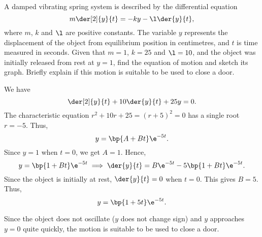 \begin{problem}
    A damped vibrating spring system is described by the differential equation \[m \der[2]{y}{t} = -ky - \l \der{y}{t},\] where $m$, $k$ and $\l$ are positive constants. The variable $y$ represents the displacement of the object from equilibrium position in centimetres, and $t$ is time measured in seconds. Given that $m = 1$, $k = 25$ and $\l = 10$, and the object was initially released from rest at $y = 1$, find the equation of motion and sketch its graph. Briefly explain if this motion is suitable to be used to close a door.
\end{problem}
\begin{solution}
    We have \[\der[2]{y}{t} + 10 \der{y}{t} + 25y = 0.\] The characteristic equation $r^2 + 10r + 25 = (r + 5)^2 = 0$ has a single root $r = -5$. Thus, \[y = \bp{A + Bt} \e^{-5 t}.\] Since $y = 1$ when $t = 0$, we get $A = 1$. Hence, \[y = \bp{1 + Bt} \e^{-5 t} \implies \der{y}{t} = B\e^{-5t} - 5\bp{1 + Bt}\e^{-5t}.\] Since the object is initially at rest, $\der{y}{t} = 0$ when $t = 0$. This gives $B = 5$. Thus, \[y = \bp{1 + 5t}\e^{-5t}.\]
    
    \begin{figure}[H]
        \centering
    \end{figure}

    Since the object does not oscillate ($y$ does not change sign) and $y$ approaches $y = 0$ quite quickly, the motion is suitable to be used to close a door.
\end{solution}

